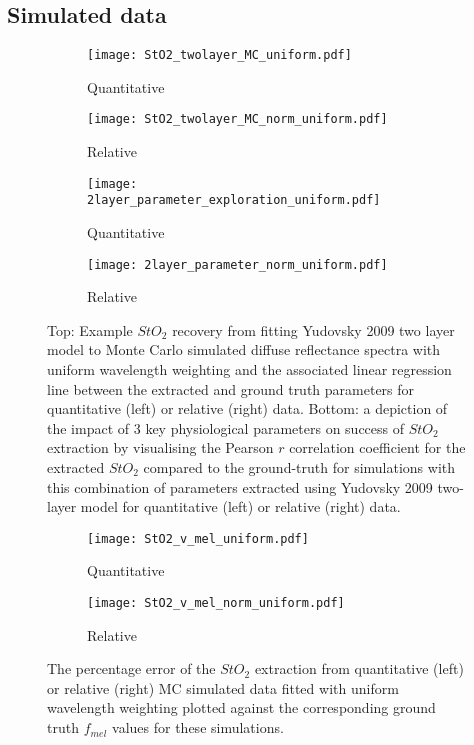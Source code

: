 \begin{subappendices}
\subsection{Simulated data}
\begin{figure}[htbp]
    \centering
    \begin{subfigure}{0.49\textwidth}
        \texttt{[image: StO2\_twolayer\_MC\_uniform.pdf]}
        \caption{Quantitative}
        \label{fig:egparamsStO2MCu}
    \end{subfigure}
    \begin{subfigure}{0.49\textwidth}
        \texttt{[image: StO2\_twolayer\_MC\_norm\_uniform.pdf]}
        \caption{Relative}
        \label{fig:egparamsStO2MCnormu}
    \end{subfigure}
    \begin{subfigure}{0.49\textwidth}
        \texttt{[image: 2layer\_parameter\_exploration\_uniform.pdf]}
        \caption{Quantitative}
        \label{fig:egparamsfailureMCu}
    \end{subfigure}
    \begin{subfigure}{0.49\textwidth}
        \texttt{[image: 2layer\_parameter\_norm\_uniform.pdf]}
        \caption{Relative}
        \label{fig:egparamsfailureMCnormu}
    \end{subfigure}
    \caption{Top: Example $StO_2$ recovery from fitting Yudovsky 2009 two layer model to Monte Carlo simulated diffuse reflectance spectra with uniform wavelength weighting and the associated linear regression line between the extracted and ground truth parameters for quantitative (left) or relative (right) data. Bottom: a depiction of the impact of 3 key physiological parameters on success of $StO_2$ extraction by visualising the Pearson $r$ correlation coefficient for the extracted $StO_2$ compared to the ground-truth for simulations with this combination of parameters extracted using Yudovsky 2009 two-layer model for quantitative (left) or relative (right) data.}
    \label{fig:MC2layeruniform}
\end{figure}
\begin{figure}[htbp] 
    \centering
    \begin{subfigure}{0.49\textwidth}
        \texttt{[image: StO2\_v\_mel\_uniform.pdf]}
        \caption{Quantitative}
        \label{fig:StO2vmelQu}
    \end{subfigure}
    \begin{subfigure}{0.49\textwidth}
        \texttt{[image: StO2\_v\_mel\_norm\_uniform.pdf]}
        \caption{Relative}
        \label{fig:StO2vmelRu}
    \end{subfigure}
    \caption{The percentage error of the $StO_2$ extraction from quantitative (left) or relative (right) MC simulated data fitted with uniform wavelength weighting plotted against the corresponding ground truth $f_{mel}$ values for these simulations.}
    \label{fig:StO2vmelu}
\end{figure}


\end{subappendices}

